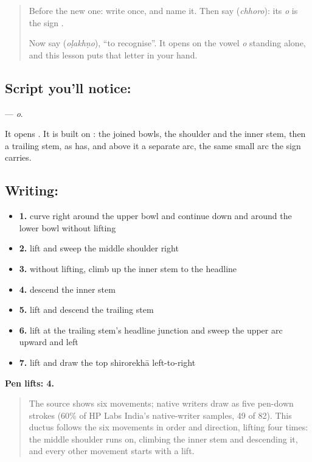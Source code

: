 \label{lesson:MW-W48-o}



\begin{quote}
Before the new one: write \textbf{} once, and name it. Then say \textbf{} (\emph{chhoro}): its \emph{o} is the sign \textbf{}.

Now say \textbf{} (\emph{oḷakhṇo}), \textquotedblleft{}to recognise\textquotedblright{}. It opens on the vowel \emph{o} standing alone, and this lesson puts that letter in your hand.
\end{quote}

\subsection*{Script you'll notice: }
\textbf{} — \emph{o}.

It opens \textbf{}. It is built on \textbf{}: the joined bowls, the shoulder and the inner stem, then a trailing stem, as \textbf{} has, and above it a separate arc, the same small arc the sign \textbf{} carries.

\subsection*{Writing: }

\begin{itemize}
\raggedright
  \item \textbf{1.} curve right around the upper bowl and continue down and around the lower bowl without lifting
  \item \textbf{2.} lift and sweep the middle shoulder right
  \item \textbf{3.} without lifting, climb up the inner stem to the headline
  \item \textbf{4.} descend the inner stem
  \item \textbf{5.} lift and descend the trailing stem
  \item \textbf{6.} lift at the trailing stem's headline junction and sweep the upper arc upward and left
  \item \textbf{7.} lift and draw the top shirorekhā left-to-right
\end{itemize}

\textbf{Pen lifts: 4.}

\begin{quote}
The source shows six movements; native writers draw  as five pen-down strokes (60\% of HP Labs India's native-writer samples, 49 of 82). This ductus follows the six movements in order and direction, lifting four times: the middle shoulder runs on, climbing the inner stem and descending it, and every other movement starts with a lift.
\end{quote}

